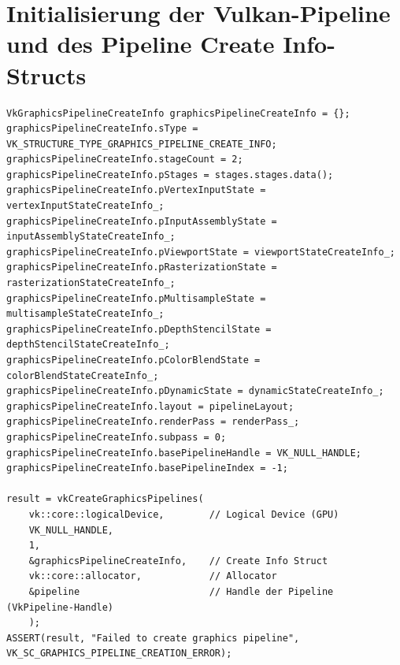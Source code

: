 \documentclass[titlepage, 11pt, a4paper, ngerman]{article}
\begin{document}
\section{Initialisierung der Vulkan-Pipeline und des Pipeline Create Info-Structs}
\begin{verbatim}
VkGraphicsPipelineCreateInfo graphicsPipelineCreateInfo = {};
graphicsPipelineCreateInfo.sType = VK_STRUCTURE_TYPE_GRAPHICS_PIPELINE_CREATE_INFO;
graphicsPipelineCreateInfo.stageCount = 2;
graphicsPipelineCreateInfo.pStages = stages.stages.data();
graphicsPipelineCreateInfo.pVertexInputState = vertexInputStateCreateInfo_;
graphicsPipelineCreateInfo.pInputAssemblyState = inputAssemblyStateCreateInfo_;
graphicsPipelineCreateInfo.pViewportState = viewportStateCreateInfo_;
graphicsPipelineCreateInfo.pRasterizationState = rasterizationStateCreateInfo_;
graphicsPipelineCreateInfo.pMultisampleState = multisampleStateCreateInfo_;
graphicsPipelineCreateInfo.pDepthStencilState = depthStencilStateCreateInfo_;
graphicsPipelineCreateInfo.pColorBlendState = colorBlendStateCreateInfo_;
graphicsPipelineCreateInfo.pDynamicState = dynamicStateCreateInfo_;    
graphicsPipelineCreateInfo.layout = pipelineLayout;
graphicsPipelineCreateInfo.renderPass = renderPass_;
graphicsPipelineCreateInfo.subpass = 0;
graphicsPipelineCreateInfo.basePipelineHandle = VK_NULL_HANDLE;
graphicsPipelineCreateInfo.basePipelineIndex = -1;

result = vkCreateGraphicsPipelines(
    vk::core::logicalDevice,        // Logical Device (GPU)
    VK_NULL_HANDLE, 
    1,
    &graphicsPipelineCreateInfo,    // Create Info Struct
    vk::core::allocator,            // Allocator
    &pipeline                       // Handle der Pipeline (VkPipeline-Handle)
    );
ASSERT(result, "Failed to create graphics pipeline", VK_SC_GRAPHICS_PIPELINE_CREATION_ERROR);
\end{verbatim}


\newpage
\end{document}
